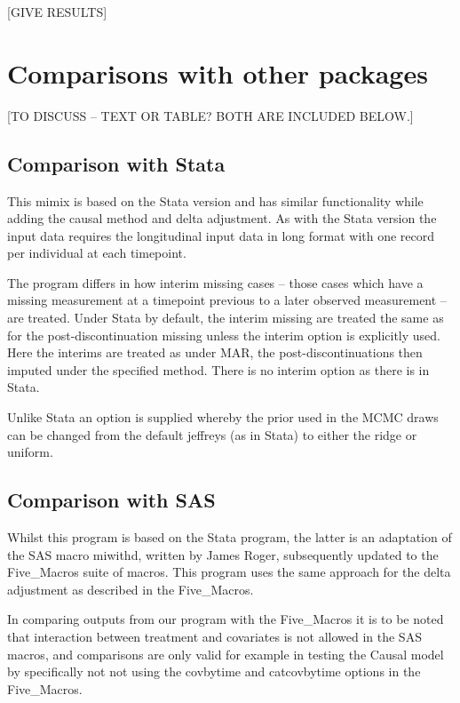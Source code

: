 [GIVE RESULTS]


\section{Comparisons with other packages}

[TO DISCUSS -- TEXT OR TABLE? BOTH ARE INCLUDED BELOW.]

\subsection{Comparison with Stata}
This mimix is based on the Stata version and has similar functionality while adding
the causal method and delta adjustment. 
As with the Stata version the input data requires the longitudinal input data in
long format with one record per individual at each timepoint.

The program differs in how interim missing cases -- those cases which 
have a missing measurement at a timepoint previous to a later observed measurement -- are treated.        
Under Stata by default, the interim missing are treated the same as for the post-discontinuation
missing unless the interim option is explicitly used. 
Here the interims are treated as under MAR, the post-discontinuations then imputed under
the specified method. There is no interim option as there is in Stata.

Unlike Stata an option is supplied whereby the prior used in the MCMC draws can be changed from the 
default jeffreys (as in Stata) to either the ridge or uniform.

\subsection{Comparison with SAS}

Whilst this program is based on the Stata program, the latter is an adaptation of the SAS macro miwithd,
written by James Roger, subsequently updated to the Five\_Macros suite of macros.
This program uses the same approach for the delta adjustment as described in the Five\_Macros.

In comparing outputs from our program with the Five\_Macros it is to be noted that interaction between treatment and covariates
is not allowed in the SAS macros, and comparisons are only valid for example in testing the Causal model by specifically not
not using the covbytime and catcovbytime options in the Five\_Macros.

